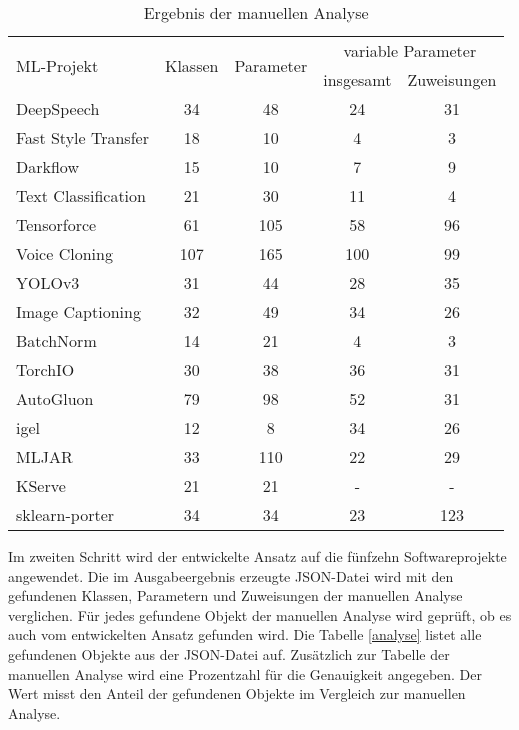 \documentclass[german,bachelor]{swsLeipzig}
\begin{document}
\begin{table}[H]
\small
\begin{center}
\setlength{\tabcolsep}{5pt}
\begin{tabular}[h]{l|c|c|c|c} %
\hline
\multirow{2}{*}{ML-Projekt} & \multirow{2}{*}{Klassen}   & \multirow{2}{*}{Parameter} &   \multicolumn{2}{c}{variable Parameter}\\
                            &           &           &   insgesamt   &   Zuweisungen \\
\hline \hline
DeepSpeech                  & 34        & 48        & 24            & 31\\
Fast Style Transfer         & 18        & 10        & 4             & 3\\
Darkflow                    & 15        & 10        & 7             & 9\\
Text Classification         & 21        & 30        & 11            & 4\\
Tensorforce                 & 61        & 105       & 58            & 96\\
\hline
Voice Cloning               & 107       & 165       & 100           & 99\\
YOLOv3                      & 31        & 44        & 28            & 35\\
Image Captioning            & 32        & 49        & 34            & 26\\
BatchNorm                   & 14        & 21        & 4             & 3\\
TorchIO                     & 30        & 38        & 36            & 31\\
\hline
AutoGluon                   & 79        & 98        & 52            & 31\\
igel                        & 12        & 8         & 34            & 26\\
MLJAR                       & 33        & 110       & 22            & 29\\
KServe                      & 21        & 21        & -             & -\\
sklearn-porter              & 34        & 34        & 23            & 123\\
\hline
\end{tabular}
\caption{Ergebnis der manuellen Analyse} \label{manuell}
\end{center}
\end{table}

Im zweiten Schritt wird der entwickelte Ansatz auf die fünfzehn Softwareprojekte angewendet.
Die im Ausgabeergebnis erzeugte JSON-Datei wird mit den gefundenen Klassen, Parametern und Zuweisungen der manuellen
Analyse verglichen.
Für jedes gefundene Objekt der manuellen Analyse wird geprüft, ob es auch vom entwickelten Ansatz gefunden wird.
Die Tabelle \ref{analyse} listet alle gefundenen Objekte aus der JSON-Datei auf.
Zusätzlich zur Tabelle der manuellen Analyse wird eine Prozentzahl für die Genauigkeit angegeben.
Der Wert misst den Anteil der gefundenen Objekte im Vergleich zur manuellen Analyse.
\end{document}
